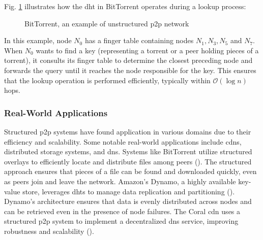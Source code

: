 Fig. \ref{fig:BitTorrent} illustrates how the \gls{dht} in BitTorrent operates during a lookup process:
\begin{figure}[htbp]
    \centering
{}
\caption{BitTorrent, an example of unstructured \gls{p2p} network}
\label{fig:BitTorrent}
\end{figure}

In this example, node $N_0$ has a finger table containing nodes $N_1, N_3, N_5$ and $N_7$.
When $N_0$ wants to find a key (representing a torrent or a peer holding pieces of a torrent), it consults its finger table to determine the closest preceding node and forwards the query until it reaches the node responsible for the key.
This ensures that the lookup operation is performed efficiently, typically within $\mathcal{O}(\log n)$ hops.

\subsubsection*{Real-World Applications}
Structured \gls{p2p} systems have found application in various domains due to their efficiency and scalability.
Some notable real-world applications include \glspl{cdn}, distributed storage systems, and \gls{dns}.
Systems like BitTorrent utilize structured overlays to efficiently locate and distribute files among peers (\cite{cohen2003incentives}).
The structured approach ensures that pieces of a file can be found and downloaded quickly, even as peers join and leave the network.
Amazon's Dynamo, a highly available key-value store, leverages \glspl{dht} to manage data replication and partitioning (\cite{DeCandia2007}).
Dynamo's architecture ensures that data is evenly distributed across nodes and can be retrieved even in the presence of node failures.
The Coral \gls{cdn} uses a structured \gls{p2p} system to implement a decentralized \gls{dns} service, improving robustness and scalability (\cite{CoralCDN2010}).

